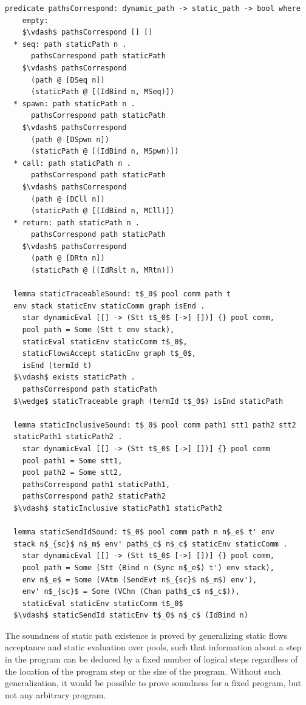 \documentclass[letterpaper, 11pt]{extarticle}
\begin{document}
\begin{lstlisting}[language=logic, mathescape]
  predicate pathsCorrespond: dynamic_path -> static_path -> bool where
    empty:
    $\vdash$ pathsCorrespond [] []
  * seq: path staticPath n .
      pathsCorrespond path staticPath
    $\vdash$ pathsCorrespond
      (path @ [DSeq n])
      (staticPath @ [(IdBind n, MSeq)])
  * spawn: path staticPath n .
      pathsCorrespond path staticPath
    $\vdash$ pathsCorrespond
      (path @ [DSpwn n])
      (staticPath @ [(IdBind n, MSpwn)])
  * call: path staticPath n .
      pathsCorrespond path staticPath
    $\vdash$ pathsCorrespond
      (path @ [DCll n])
      (staticPath @ [(IdBind n, MCll)])
  * return: path staticPath n .
      pathsCorrespond path staticPath
    $\vdash$ pathsCorrespond
      (path @ [DRtn n])
      (staticPath @ [(IdRslt n, MRtn)])

  lemma staticTraceableSound: t$_0$ pool comm path t 
  env stack staticEnv staticComm graph isEnd .
    star dynamicEval [[] -> (Stt t$_0$ [->] [])] {} pool comm, 
    pool path = Some (Stt t env stack),
    staticEval staticEnv staticComm t$_0$,
    staticFlowsAccept staticEnv graph t$_0$,
    isEnd (termId t)
  $\vdash$ exists staticPath . 
    pathsCorrespond path staticPath
  $\wedge$ staticTraceable graph (termId t$_0$) isEnd staticPath

  lemma staticInclusiveSound: t$_0$ pool comm path1 stt1 path2 stt2
  staticPath1 staticPath2 . 
    star dynamicEval [[] -> (Stt t$_0$ [->] [])] {} pool comm
    pool path1 = Some stt1, 
    pool path2 = Some stt2, 
    pathsCorrespond path1 staticPath1, 
    pathsCorrespond path2 staticPath2
  $\vdash$ staticInclusive staticPath1 staticPath2

  lemma staticSendIdSound: t$_0$ pool comm path n n$_e$ t' env
  stack n$_{sc}$ n$_m$ env' path$_c$ n$_c$ staticEnv staticComm .
    star dynamicEval [[] -> (Stt t$_0$ [->] [])] {} pool comm, 
    pool path = Some (Stt (Bind n (Sync n$_e$) t') env stack), 
    env n$_e$ = Some (VAtm (SendEvt n$_{sc}$ n$_m$) env'), 
    env' n$_{sc}$ = Some (VChn (Chan path$_c$ n$_c$)), 
    staticEval staticEnv staticComm t$_0$
  $\vdash$ staticSendId staticEnv t$_0$ n$_c$ (IdBind n)
\end{lstlisting}

The soundness of static path existence is proved by generalizing
static flows acceptance and static evaluation over pools, such that information about a step in
the program can be deduced by a fixed number of logical steps regardless of the location of the
program step or the size of the program. Without such generalization, it would be possible to
prove soundness for a fixed program, but not any arbitrary program.
\end{document}
